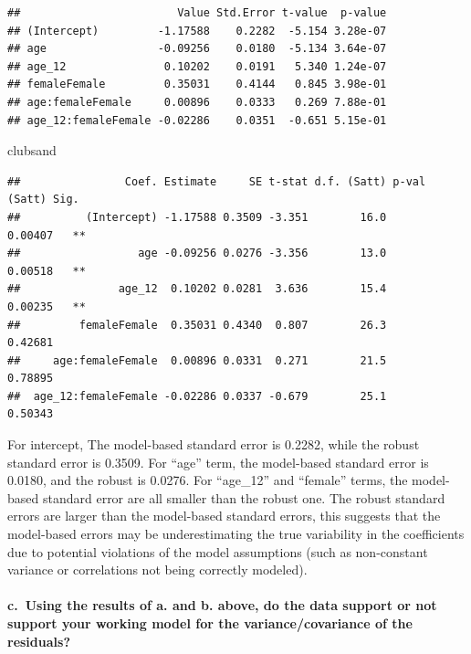 \documentclass[
]{article}
\newenvironment{Shaded}{\begin{snugshade}}{\end{snugshade}}
\newcommand{\NormalTok}[1]{#1}
\begin{document}
\begin{verbatim}
##                        Value Std.Error t-value  p-value
## (Intercept)         -1.17588    0.2282  -5.154 3.28e-07
## age                 -0.09256    0.0180  -5.134 3.64e-07
## age_12               0.10202    0.0191   5.340 1.24e-07
## femaleFemale         0.35031    0.4144   0.845 3.98e-01
## age:femaleFemale     0.00896    0.0333   0.269 7.88e-01
## age_12:femaleFemale -0.02286    0.0351  -0.651 5.15e-01
\end{verbatim}

\begin{Shaded}
\begin{Highlighting}[]
\NormalTok{clubsand}
\end{Highlighting}
\end{Shaded}

\begin{verbatim}
##                Coef. Estimate     SE t-stat d.f. (Satt) p-val (Satt) Sig.
##          (Intercept) -1.17588 0.3509 -3.351        16.0      0.00407   **
##                  age -0.09256 0.0276 -3.356        13.0      0.00518   **
##               age_12  0.10202 0.0281  3.636        15.4      0.00235   **
##         femaleFemale  0.35031 0.4340  0.807        26.3      0.42681     
##     age:femaleFemale  0.00896 0.0331  0.271        21.5      0.78895     
##  age_12:femaleFemale -0.02286 0.0337 -0.679        25.1      0.50343
\end{verbatim}

For intercept, The model-based standard error is 0.2282, while the
robust standard error is 0.3509. For ``age'' term, the model-based
standard error is 0.0180, and the robust is 0.0276. For ``age\_12'' and
``female'' terms, the model-based standard error are all smaller than
the robust one. The robust standard errors are larger than the
model-based standard errors, this suggests that the model-based errors
may be underestimating the true variability in the coefficients due to
potential violations of the model assumptions (such as non-constant
variance or correlations not being correctly modeled).

\hypertarget{c.-using-the-results-of-a.-and-b.-above-do-the-data-support-or-not-support-your-working-model-for-the-variancecovariance-of-the-residuals}{%
\paragraph{c.~Using the results of a. and b. above, do the data support
or not support your working model for the variance/covariance of the
residuals?}\label{c.-using-the-results-of-a.-and-b.-above-do-the-data-support-or-not-support-your-working-model-for-the-variancecovariance-of-the-residuals}}
\end{document}
